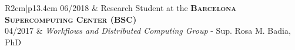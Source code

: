 \documentclass[a4paper,10pt]{article} %
\newcommand\rightColumnWidth{13.4cm}
\newcommand\leftColumnWidth{2cm}
\begin{document}
\begin{tabular}{R{\leftColumnWidth}|p{\rightColumnWidth}}
    \textsc{06/2018} & Research Student at the \textbf{\textsc{Barcelona Supercomputing Center} (BSC)} \\
    \textsc{04/2017} & \small{\emph{Workflows and Distributed Computing Group} - Sup. Rosa M. Badia, PhD} \\
\end{tabular}
\end{document}
